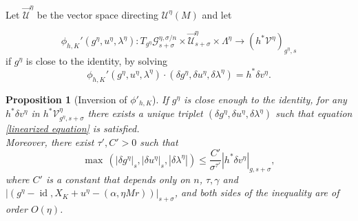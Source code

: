 \documentclass[oneside, 11pt]{amsbook}
\newcommand{\comment}[1]{}
\newcommand{\pa}[1]{{\left(#1\right)}}
\newcommand{\abs}[1]{{\left|#1\right|}}
\newcommand{\U}{\mathcal{U}}
\newcommand{\id}{\operatorname{id}}
\def\U{{\mathcal U}}
\newcommand{\cU}{{\mathcal U}}
\newcommand{\0}{{(0)}}
\newcommand{\3}{{(3)}}
\newtheorem{prop}{Proposition}[section]
\numberwithin{equation}{section}
\numberwithin{defn}{section}
\numberwithin{prop}{section}
\numberwithin{cor}{section}
\numberwithin{lemma}{section}
\numberwithin{rmk}{section}
\numberwithin{corollary}{section}
\begin{document}
Let $\overrightarrow{\U}^\eta$ be the vector space directing $\cU^\eta(M)$ and let 

\[\phi_{h,K}'(g^\eta,u^\eta,\lambda^\eta): T_{g^\eta}\mathcal{G}^{\eta,\sigma/n}_{s+\sigma}\times\overrightarrow{\mathcal{U}}^\eta_{s+\sigma}\times\Lambda^\eta\to (h^{*}\mathcal{V}^\eta)_{g^\eta,s}\] if $g^\eta$ is close to the identity, by solving 
\begin{equation}\phi_{h,K}'(g^\eta,u^\eta,\lambda^\eta)\cdot (\delta g^\eta,\delta u^\eta, \delta \lambda^\eta) = h^{*}\delta v^\eta.
\label{linearized equation}
\end{equation}


\begin{prop}[Inversion of $\phi'_{h,K}$]
\label{bound dphi-1}
If $g^\eta$ is close enough to the identity, for any $h^{*}\delta v^\eta$ in $h^{*}\mathcal{V}^\eta_{g^\eta,s+\sigma}$ there exists a unique triplet $(\delta g^\eta,\delta u^\eta, \delta \lambda^\eta)$ \comment{$\in T_g\mathcal{G}_{s}\times\overrightarrow{\mathcal{U}_{s}}\times\Lambda$} such that equation \eqref{linearized equation} is satisfied.\\ 
Moreover, there exist $\tau', C' > 0$ such that
\begin{equation}
\max\,(\abs{\delta g^\eta}_s,\abs{\delta u^\eta}_s,\abs{\delta\lambda^\eta})\leq \frac{C'}{\sigma^{\tau'}}\abs{h^{*}\delta v^\eta}_{g,s+\sigma},
\label{linear bounds}
\end{equation}
 where $C'$ is a constant that depends only on $n$, $\tau,\gamma$ and $\abs{\pa{g^\eta - \id, X_K + u^\eta - (\alpha, \eta M r)}}_{s+\sigma}$, and both sides of the inequality are of order $O(\eta)$.
\end{prop}
\end{document}
